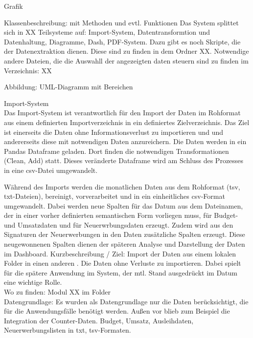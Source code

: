     Grafik
    
    Klassenbeschreibung: mit Methoden und evtl. Funktionen
    Das System splittet sich in XX Teilsysteme auf: Import-System, Datentransformtion und Datenhaltung, Diagramme, Dash, PDF-System. Dazu gibt es noch Skripte,
    die der Datenextraktion dienen. Diese sind zu finden in dem Ordner XX. Notwendige andere Dateien, die die Auswahll der angezeigten daten steuern sind zu finden im          
    Verzeichnis: XX
    
    Abbildung: UML-Diagramm mit Bereichen
    
    
    Import-System\\
    Das Import-System ist verantwortlich für den Import der Daten im Rohformat aus einem definierten Importverzeichnis in ein definiertes Zielverzeichnis. Das Ziel
    ist einerseits die Daten ohne Informationsverlust zu importieren und und andererseits diese mit notwendigen Daten anzureichern. Die Daten werden in ein Pandas Dataframe
    geladen. Dort finden die notwendigen Transformationen (Clean, Add) statt. Dieses veränderte Dataframe wird am Schluss des Prozesses in eine csv-Datei umgewandelt.
    
    
    Während des Imports werden 
    die monatlichen Daten aus dem Rohformat (tsv, txt-Dateien), bereinigt, vorverarbeitet und in ein einheitliches csv-Format umgewandelt. Dabei werden neue Spalten für das
    Datum aus dem Dateinamen, der in einer vorher definierten semantischen Form vorliegen muss, für Budget- und Umsatzdaten und für Neuerwrbungsdaten erzeugt. Zudem wird aus
    den Signaturen der Neuerwerbungen in den Daten zusätzliche Spalten erzeugt. Diese neugewonnenen Spalten dienen der späteren Analyse und Darstellung der Daten im Dashboard.
    Kurzbeschreibung / Ziel: Import der Daten aus einem lokalen Folder in einen anderen . 
    Die Daten ohne Verluste zu importieren. Dabei spielt für die spätere Anwendung im System, der mtl. Stand ausgedrückt im Datum eine wichtige Rolle.\\
    Wo zu finden: Modul XX im Folder \\
    Datengrundlage: Es wurden als Datengrundlage nur die Daten berücksichtigt, die für die Anwendungsfälle benötigt werden.
    Außen vor blieb zum Beispiel die Integration der Counter-Daten.
    Budget, Umsatz, Ausleihdaten, Neuerwerbungslisten in txt, tsv-Formaten.
 
 
 
 
 
 
 
 
 

